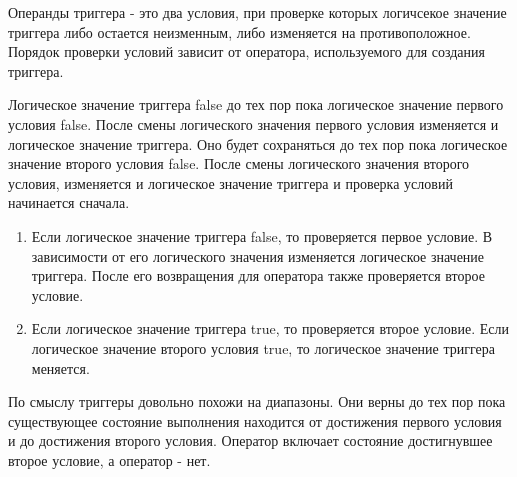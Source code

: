 Операнды триггера - это два условия, при проверке которых логичсекое значение триггера либо остается неизменным, либо изменяется на противоположное. Порядок проверки условий зависит от оператора, используемого для создания триггера.

Логическое значение триггера false до тех пор пока логическое значение первого условия false. После смены логического значения первого условия изменяется и логическое значение триггера. Оно будет сохраняться до тех пор пока логическое значение второго условия false. После смены логического значения второго условия, изменяется и логическое значение триггера и проверка условий начинается сначала.

\begin{enumerate}
  \item Если логическое значение триггера false, то проверяется первое условие. В зависимости от его логического значения изменяется логическое значение триггера. После его возвращения для оператора  также проверяется второе условие.

  \item Если логическое значение триггера true, то проверяется второе условие. Если логическое значение второго условия true, то логическое значение триггера меняется.
\end{enumerate}

\begin{note}
  По смыслу триггеры довольно похожи на диапазоны. Они верны до тех пор пока существующее состояние выполнения находится от достижения первого условия и до достижения второго условия. Оператор  включает состояние достигнувшее второе условие, а оператор  - нет. 
\end{note}
